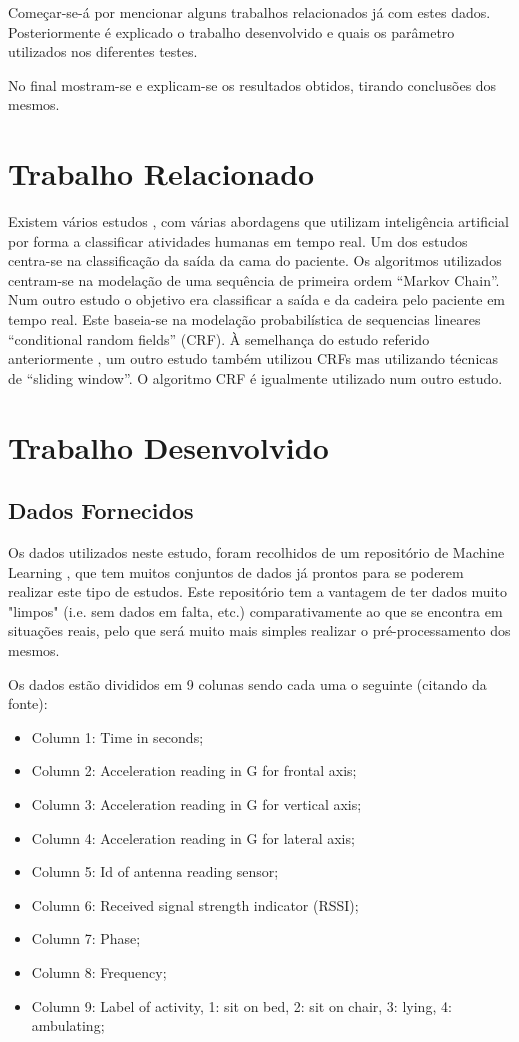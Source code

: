 \documentclass[conference]{IEEEtran}
\begin{document}
Começar-se-á por mencionar alguns trabalhos relacionados já com estes dados. Posteriormente é explicado o trabalho desenvolvido e quais os parâmetro utilizados nos diferentes testes.

No final mostram-se e explicam-se os resultados obtidos, tirando conclusões dos mesmos.


\section{Trabalho Relacionado}
Existem vários estudos \cite{b1} \cite{b2} \cite{b3} \cite{b4}, com várias abordagens que utilizam inteligência artificial por forma a classificar atividades humanas em tempo real.
Um dos estudos \cite{b1} centra-se na classificação da saída da cama do paciente. Os algoritmos utilizados centram-se na modelação de uma sequência de primeira ordem “Markov Chain”.
Num outro estudo \cite{b2} o objetivo era classificar a saída e da cadeira pelo paciente em tempo real. Este baseia-se na modelação probabilística de sequencias lineares “conditional random fields” (CRF).
À semelhança do estudo referido anteriormente \cite{b2}, um outro estudo \cite{b3} também utilizou CRFs mas utilizando técnicas de “sliding window”.
O algoritmo CRF é igualmente utilizado num outro estudo. \cite{b4}


\section{Trabalho Desenvolvido}

\subsection{Dados Fornecidos}
Os dados utilizados neste estudo, foram recolhidos de um repositório de Machine Learning \cite{b5}, que tem muitos conjuntos de dados já prontos para se poderem realizar este tipo de estudos. Este repositório tem a vantagem de ter dados muito "limpos" (i.e. sem dados em falta, etc.) comparativamente ao que se encontra em situações reais, pelo que será muito mais simples realizar o pré-processamento dos mesmos.

Os dados estão divididos em 9 colunas sendo cada uma o seguinte (citando da fonte):
\begin{itemize}
	\item Column 1: Time in seconds;
	\item Column 2: Acceleration reading in G for frontal axis;
	\item Column 3: Acceleration reading in G for vertical axis;
	\item Column 4: Acceleration reading in G for lateral axis;
	\item Column 5: Id of antenna reading sensor;
	\item Column 6: Received signal strength indicator (RSSI);
	\item Column 7: Phase;
	\item Column 8: Frequency;
	\item Column 9: Label of activity, 1: sit on bed, 2: sit on chair, 3: lying, 4: ambulating; 
\end{itemize}
\end{document}
